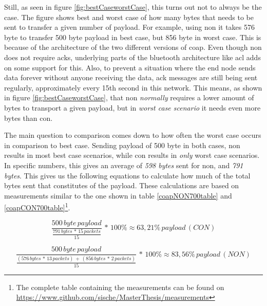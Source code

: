 \noindent Still, as seen in figure \ref{fig:bestCaseworstCase}, this turns out not to always be the case. The figure shows best and worst case of how many bytes that needs to be sent to transfer a given number of \gls{payload}. For example, using \gls{non} it takes 576 byte to transfer 500 byte payload in best case, but 856 byte in worst case. This is because of the architecture of the two different versions of \gls{coap}. Even though \gls{non} does not require \glspl{ack}, underlying parts of the bluetooth architecture like \gls{acl} adds on some support for this. Also, to prevent a situation where the end node sends data forever without anyone receiving the data, \gls{ack} messages are still being sent regularly, approximately every 15th second in this network. This means, as shown in figure \ref{fig:bestCaseworstCase}, that \gls{non} \textit{normally} requires a lower amount of bytes to transport a given \gls{payload}, but in \textit{worst case scenario} it needs even more bytes than \gls{con}. 






\noindent The main question to comparison comes down to how often the worst case occurs in comparison to best case. Sending payload of 500 byte in both cases, \gls{non} results in most best case scenarios, while \gls{con} results in \textit{only} worst case scenarios. In specific numbers, this gives an average of \textit{598 bytes} sent for \gls{non}, and \textit{791 bytes}. This gives us the following equations to calculate how much of the total bytes sent that constitutes of the \gls{payload}. These calculations are based on measurements similar to the one shown in table \ref{coapNON700table} and \ref{coapCON700table}\footnote{The complete table containing the measurements can be found on \url{https://www.github.com/sische/MasterThesis/measurements}}. 



\begin{equation} \label{bestWorstEquation}
	\frac{500 \, byte \, payload}{\frac{791 \, bytes \,*\, 15 \, packets}{15}}\,*\,100 \% \approx 63,21 \%\, payload \, (CON)
\end{equation}

\begin{equation} \label{bestWorstEquation2}
\frac{500\, byte\, payload}{\frac{(576\, bytes\, *\, 13\, packets)\,+\,(856\, bytes\, *\, 2 \,packets)}{15}}\,*\,100 \% \approx 83,56 \%\, payload \, (NON)
\end{equation}

